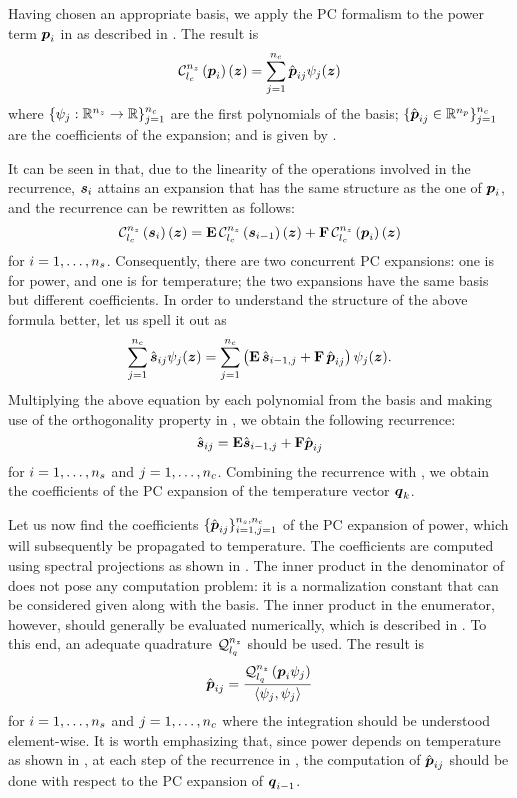 Having chosen an appropriate basis, we apply the \ac{PC} formalism to the power
term $\boldsymbol{p}_i$ in  as described in
. The result is
\[
  \chaos{\nz}{\lc}{\vp_i}(\vz) = \sum_{j = 1}^\nc \hat{\vp}_{ij} \psi_j(\vz)
\]
where $\{ \psi_j: \mathbb{R}^{n_{z}} \to \mathbb{R} \}_{j = 1}^{n_{c}}$ are the first \nc
polynomials of the basis; $\{ \hat{\boldsymbol{p}}_{ij} \in \mathbb{R}^{n_{p}} \}_{j = 1}^{n_{c}}$ are
the coefficients of the expansion; and \nc is given by
.

It can be seen in  that, due to the linearity
of the operations involved in the recurrence, $\boldsymbol{s}_i$ attains an expansion that
has the same structure as the one of $\boldsymbol{p}_i$, and the recurrence can be
rewritten as follows:
\[
  \chaos{\nz}{\lc}{\vs_i}(\vz) = \m{E} \, \chaos{\nz}{\lc}{\vs_{i - 1}}(\vz) + \m{F} \, \chaos{\nz}{\lc}{\vp_i}(\vz)
\]
for $i = 1, \dots, {n_{s}}$. Consequently, there are two concurrent \ac{PC}
expansions: one is for power, and one is for temperature; the two expansions
have the same basis but different coefficients. In order to understand the
structure of the above formula better, let us spell it out as
\[
  \sum_{j = 1}^{n_{c}} \hat{\boldsymbol{s}}_{ij} \psi_j(\boldsymbol{z}) =
  \sum_{j = 1}^{n_{c}} \left( \mathbf{E} \, \hat{\boldsymbol{s}}_{i - 1, j} + \mathbf{F} \, \hat{\boldsymbol{p}}_{ij} \right) \psi_j(\boldsymbol{z}).
\]
Multiplying the above equation by each polynomial from the basis and making use
of the orthogonality property in , we obtain the
following recurrence:
\begin{equation} \elab{analog-recurrence}
  \hat{\vs}_{ij} = \m{E} \hat{\vs}_{i - 1, j} + \m{F} \hat{\vp}_{ij}
\end{equation}
for $i = 1, \dots, {n_{s}}$ and $j = 1, \dots, {n_{c}}$. Combining the recurrence with
, we obtain the coefficients of the \ac{PC}
expansion of the temperature vector $\boldsymbol{q}_k$.

Let us now find the coefficients $\{ \hat{\boldsymbol{p}}_{ij} \}_{i = 1, j = 1}^{{n_{s}},
{n_{c}}}$ of the \ac{PC} expansion of power, which will subsequently be propagated
to temperature. The coefficients are computed using spectral projections as
shown in . The inner product in the denominator of
 does not pose any computation problem: it is a
normalization constant that can be considered given along with the basis. The
inner product in the enumerator, however, should generally be evaluated
numerically, which is described in . To this end, an
adequate quadrature $\quadrature{\nz}{\lq}$ should be used. The result is
\[
  \hat{\vp}_{ij} = \frac{\quadrature{\nz}{\lq}{\vp_i \psi_j}}{\innerproduct{\psi_j}{\psi_j}}
\]
for $i = 1, \dots, {n_{s}}$ and $j = 1, \dots, {n_{c}}$ where the integration should
be understood element-wise. It is worth emphasizing that, since power depends on
temperature as shown in , at each step of the recurrence in
, the computation of $\hat{\boldsymbol{p}}_{ij}$ should be done
with respect to the \ac{PC} expansion of $\boldsymbol{q}_{i - 1}$.

